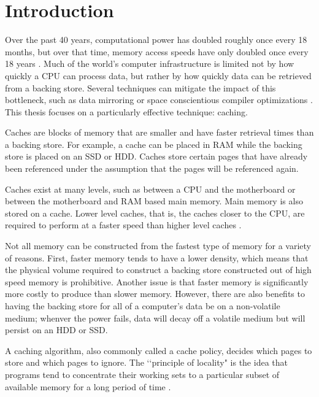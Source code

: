 \chapter{Introduction}

  Over the past 40 years, computational power has doubled roughly once every 18
  months, but over that time, memory access speeds have only doubled once every
  18 years \cite{hennessy2012computer}. Much of the world's computer
  infrastructure is limited not by how quickly a CPU can process data, but
  rather by how quickly data can be retrieved from a backing store. Several
  techniques can mitigate the impact of this bottleneck, such as data mirroring
  or space conscientious compiler optimizations \cite{wolf1991data,
  patterson1988case}. This thesis focuses on a particularly effective technique:
  caching.

  Caches are blocks of memory that are smaller and have faster retrieval times
  than a backing store. For example, a cache can be placed in RAM while the
  backing store is placed on an SSD or HDD. Caches store certain pages that have
  already been referenced under the assumption that the pages will be referenced
  again.

  Caches exist at many levels, such as between a CPU and the motherboard or
  between the motherboard and RAM based main memory. Main memory is also
  stored on a cache. Lower level caches, that is, the caches closer to the
  CPU, are required to perform at a faster speed than higher level caches
  \cite{tanenbaum2007modern}.

  Not all memory can be constructed from the fastest type of memory for a
  variety of reasons. First, faster memory tends to have a lower density, which
  means that the physical volume required to construct a backing store
  constructed out of high speed memory is prohibitive. Another issue is that
  faster memory is significantly more costly to produce than slower memory.
  However, there are also benefits to having the backing store for all of a
  computer's data be on a non-volatile medium; whenver the power fails, data
  will decay off a volatile medium but will persist on an HDD or SSD.

  A caching algorithm, also commonly called a cache policy, decides which pages
  to store and which pages to ignore. The \lq\lq principle of locality" is the idea
  that programs tend to concentrate their working sets to a particular subset
  of available memory for a long period of time \cite{aho1971principles}.

